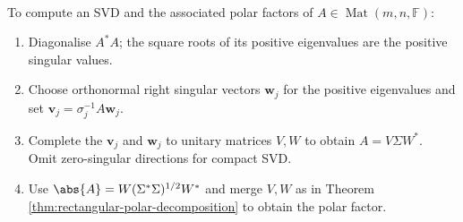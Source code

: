 \begin{method} \label{meth:svd-polar-computation} \\
To compute an SVD and the associated polar factors of $A\in\operatorname{Mat}(m,n,\mathbb{F})$:
\begin{enumerate}[label=(\roman*)]
\setlength{\itemsep}{0pt}
\item Diagonalise $A^*A$; the square roots of its positive eigenvalues are the positive singular values.
\item Choose orthonormal right singular vectors $\mathbf{w}_j$ for the positive eigenvalues and set $\mathbf{v}_j=\sigma_j^{-1}A\mathbf{w}_j$.
\item Complete the $\mathbf{v}_j$ and $\mathbf{w}_j$ to unitary matrices $V,W$ to obtain $A=V\Sigma W^*$.\\
Omit zero-singular directions for compact SVD.
\item Use $\abs{A}=W(\Sigma^*\Sigma)^{1/2}W^*$ and merge $V,W$ as in Theorem \ref{thm:rectangular-polar-decomposition} to obtain the polar factor.
\end{enumerate}
\end{method}

